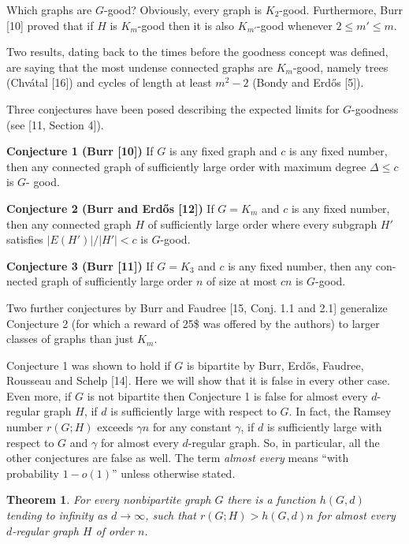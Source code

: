 \documentclass[12pt,a4paper]{article}
\newtheorem{theorem}{Theorem}
\begin{document}
Which graphs are $G$-good? Obviously, every graph is $K_2$-good. Furthermore,
Burr [10] proved that if $H$ is $K_m$-good then it is also $K_{m'}$-good whenever $2\le m'\le m$.

Two results, dating back to the times before the goodness concept was defined,
are saying that the most undense connected graphs are $K_m$-good, namely trees
(Chv\'atal [16]) and cycles of length at least $m^2-2$ (Bondy and Erd\H{o}s [5]).

Three conjectures have been posed describing the expected limits for $G$-goodness
(see [11, Section 4]).

\medskip
\noindent\textbf{Conjecture 1 (Burr [10])} If $G$ is any fixed graph and $c$ is any fixed number, then
any connected graph of sufficiently large order with maximum degree $\Delta\le c$ is $G$-
good.

\medskip
\noindent\textbf{Conjecture 2 (Burr and Erd\H{o}s [12])} If $G=K_m$ and $c$ is any fixed number, then
any connected graph $H$ of sufficiently large order where every subgraph $H'$ satisfies
$|E(H')|/|H'|<c$ is $G$-good.

\medskip
\noindent\textbf{Conjecture 3 (Burr [11])} If $G=K_3$ and $c$ is any fixed number, then any con-
nected graph of sufficiently large order $n$ of size at most $cn$ is $G$-good.

Two further conjectures by Burr and Faudree [15, Conj. 1.1 and 2.1] generalize
Conjecture 2 (for which a reward of 25\$ was offered by the authors) to larger classes
of graphs than just $K_m$.

Conjecture 1 was shown to hold if $G$ is bipartite by Burr, Erd\H{o}s, Faudree,
Rousseau and Schelp [14]. Here we will show that it is false in every other case.
Even more, if $G$ is not bipartite then Conjecture 1 is false for almost every $d$-regular
graph $H$, if $d$ is sufficiently large with respect to $G$. In fact, the Ramsey number
$r(G;H)$ exceeds $\gamma n$ for any constant $\gamma$, if $d$ is sufficiently large with respect to $G$
and $\gamma$ for almost every $d$-regular graph. So, in particular, all the other conjectures
are false as well. The term \emph{almost every} means ``with probability $1-o(1)$'' unless
otherwise stated.

\begin{theorem}
For every nonbipartite graph $G$ there is a function $h(G,d)$ tending to
infinity as $d\to\infty$, such that $r(G;H)>h(G,d)n$ for almost every $d$-regular graph
$H$ of order $n$.
\end{theorem}
\end{document}

